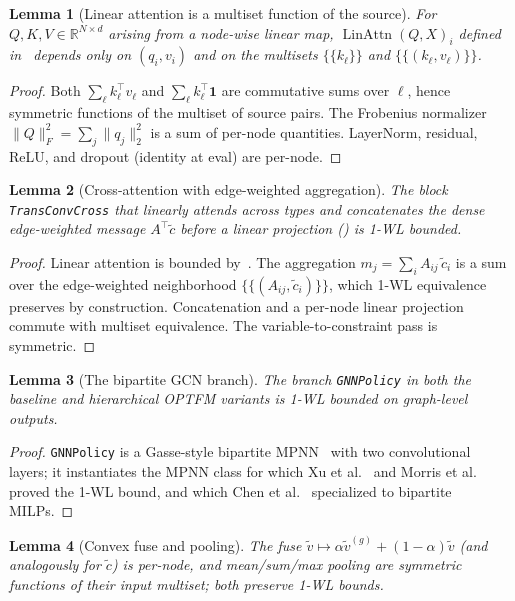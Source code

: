 \documentclass[11pt]{article}
\theoremstyle{plain}
\newtheorem{lemma}{Lemma}
\theoremstyle{definition}
\theoremstyle{remark}
\newcommand{\optfm}{\textsc{OPTFM}}
\newcommand{\multiset}[1]{\{\!\!\{#1\}\!\!\}}
\DeclareMathOperator*{\LinAttn}{LinAttn}
\begin{document}
\begin{lemma}[Linear attention is a multiset function of the source]\label{lem:linattn}
For \(Q,K,V\in\mathbb R^{N\times d}\) arising from a node-wise linear map,
\(\LinAttn(Q,X)_i\) defined in~ depends only on $(q_i, v_i)$
and on the multisets $\multiset{k_\ell}$ and $\multiset{(k_\ell, v_\ell)}$.
\end{lemma}
\begin{proof}
Both $\sum_\ell k_\ell^\top v_\ell$ and $\sum_\ell k_\ell^\top \mathbf 1$ are
commutative sums over $\ell$, hence symmetric functions of the multiset of
source pairs. The Frobenius normalizer $\|Q\|_F^2 = \sum_j \|q_j\|_2^2$ is a
sum of per-node quantities. LayerNorm, residual, ReLU, and dropout (identity
at eval) are per-node. \qedhere
\end{proof}

\begin{lemma}[Cross-attention with edge-weighted aggregation]\label{lem:cross}
The block \texttt{TransConvCross} that linearly attends across types and
concatenates the dense edge-weighted message $A^\top \tilde c$ before a linear
projection () is 1-WL bounded.
\end{lemma}
\begin{proof}
Linear attention is bounded by~. The aggregation
$m_j = \sum_i A_{ij}\,\tilde c_i$ is a sum over the edge-weighted neighborhood
$\multiset{(A_{ij},\tilde c_i)}$, which 1-WL equivalence preserves by
construction. Concatenation and a per-node linear projection commute with
multiset equivalence. The variable-to-constraint pass is symmetric. \qedhere
\end{proof}

\begin{lemma}[The bipartite GCN branch]\label{lem:gcn}
The branch \texttt{GNNPolicy} in both the baseline and hierarchical
\optfm{} variants is 1-WL bounded on graph-level outputs.
\end{lemma}
\begin{proof}
\texttt{GNNPolicy} is a Gasse-style bipartite MPNN~\cite{gasse2019exact} with
two convolutional layers; it instantiates the MPNN class for which Xu et
al.~\cite{xu2019powerful} and Morris et al.~\cite{morris2019wlgo} proved the
1-WL bound, and which Chen et al.~\cite{chen2023expressive} specialized to
bipartite MILPs. \qedhere
\end{proof}

\begin{lemma}[Convex fuse and pooling]\label{lem:fuse}
The fuse $\tilde v \mapsto \alpha\tilde v^{(g)}+(1-\alpha)\tilde v$ (and
analogously for $\tilde c$) is per-node, and mean/sum/max pooling are
symmetric functions of their input multiset; both preserve 1-WL bounds.
\end{lemma}
\end{document}
